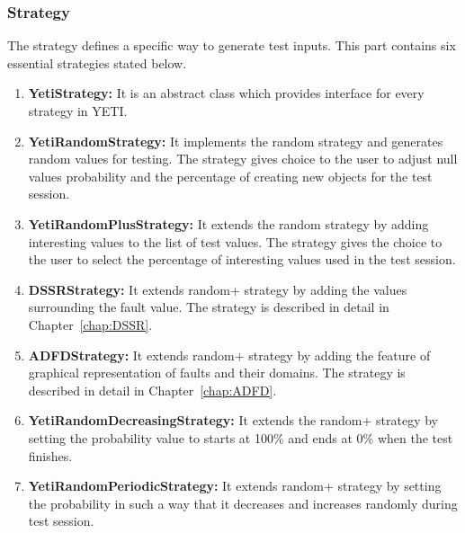 \subsubsection{Strategy}
The strategy defines a specific way to generate test inputs. This part contains six essential strategies stated below.
\begin{enumerate}
\item {\textbf{YetiStrategy:}} It is an abstract class which provides interface for every strategy in YETI.
\item {\textbf{YetiRandomStrategy:}} It implements the random strategy and generates random values for testing. The strategy gives choice to the user to adjust null values probability and the percentage of creating new objects for the test session. 
\item {\textbf{YetiRandomPlusStrategy:}} It extends the random strategy by adding interesting values to the list of test values. The strategy gives the choice to the user to select the percentage of interesting values used in the test session.
\item {\textbf{DSSRStrategy:}} It extends random+ strategy by adding the values surrounding the fault value. The strategy is described in detail in Chapter~\ref{chap:DSSR}.
\item {\textbf{ADFDStrategy:}} It extends random+ strategy by adding the feature of graphical representation of faults and their domains. The strategy is described in detail in Chapter~\ref{chap:ADFD}.
\item {\textbf{YetiRandomDecreasingStrategy:}} It extends the random+ strategy by setting the probability value to starts at 100\% and ends at 0\% when the test finishes.
\item {\textbf{YetiRandomPeriodicStrategy:}} It extends random+ strategy by setting the probability in such a way that it decreases and increases randomly during test session.
\end{enumerate}

